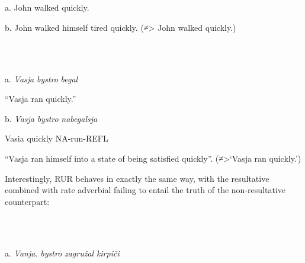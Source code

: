 \documentclass[output=paper,modfonts, nonflat]{langsci/langscibook}
\begin{document}
\begin{styleinnerExample}
\ea%
    \label{ex:key:39}
    \gll\\
        \\
    \glt
    \z

          a.  John walked quickly.
\end{styleinnerExample}

\begin{styleinnerExample}
  b.  John walked himself tired quickly. (≠> John walked quickly.) 
\end{styleinnerExample}

\begin{styleinnerExample}
\ea%
    \label{ex:key:40}
    \gll\\
        \\
    \glt
    \z

          a.  \textit{Vasja} \textit{bystro} \textit{begal}
\end{styleinnerExample}

\begin{styleinnerExample}
    “Vasja ran quickly.” 
\end{styleinnerExample}

\begin{styleinnerExample}
  b.  \textit{Vasja} \textit{bystro} \textit{nabegalsja}
\end{styleinnerExample}

\begin{styleinnerExample}
    Vasia quickly NA-run-REFL
\end{styleinnerExample}

\begin{styleinnerExample}
    “Vasja ran himself into a state of being satisfied quickly”. (≠>‘Vasja ran quickly.’) 
\end{styleinnerExample}

Interestingly, RUR behaves in exactly the same way, with the resultative combined with rate adverbial failing to entail the truth of the non-resultative counterpart:

\begin{styleinnerExample}
\ea%
    \label{ex:key:41}
    \gll\\
        \\
    \glt
    \z

           a.  \textit{Vanja.}         \textit{bystro}   \textit{zagružal} \textit{kirpiči}
\end{styleinnerExample}
\end{document}
